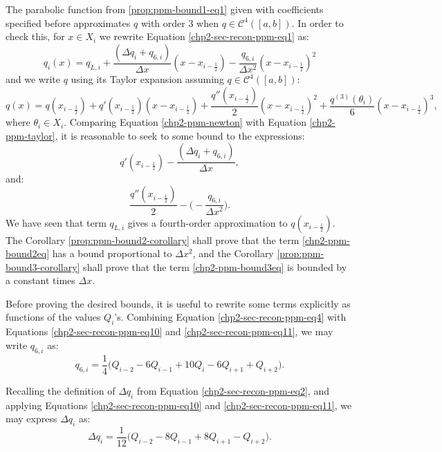 The parabolic function from \eqref{prop:ppm-bound1-eq1} given with 
coefficients specified before approximates $q$ with order 3 when 
$q \in \mathcal{C}^4([a,b])$.
In order to check this, for $x \in X_i$ we rewrite Equation 
\eqref{chp2-sec-recon-ppm-eq1} as: 
\begin{equation}
	\label{chp2-ppm-newton}
	q_i(x) = q_{L,i} + \frac{(\Delta q_i + q_{6, i})}{\Delta x}(x-x_{i-\frac{1}{2}})
	-\frac{q_{6, i}}{\Delta x^2}(x-x_{i-\frac{1}{2}})^2
\end{equation}
and we write $q$ using its Taylor expansion assuming $q \in \mathcal{C}^4([a,b])$:
\begin{equation}
	\label{chp2-ppm-taylor}
	q(x) = q(x_{i-\frac{1}{2}}) + q'(x_{i-\frac{1}{2}})(x-x_{i-\frac{1}{2}})
	+ \frac{q''(x_{i-\frac{1}{2}})}{2}(x-x_{i-\frac{1}{2}})^2
	+ \frac{q^{(3)}(\theta_i)}{6}(x-x_{i-\frac{1}{2}})^3,
\end{equation}
where $\theta_i \in X_i$.
Comparing Equation \eqref{chp2-ppm-newton} with Equation \eqref{chp2-ppm-taylor},
it is reasonable to seek to some bound to the expressions:
\begin{equation}
	\label{chp2-ppm-bound2eq}
	q'(x_{i-\frac{1}{2}})-\frac{(\Delta q_i + q_{6, i})}{\Delta x},
\end{equation}
and:
\begin{equation} 
	\label{chp2-ppm-bound3eq}
	\frac{q''(x_{i-\frac{1}{2}})}{2} -\bigg(-\frac{q_{6, i}}{\Delta x^2}\bigg).
\end{equation}
We have seen that term $q_{L,i}$ gives a fourth-order approximation to $q(x_{i-\frac{1}{2}})$.
The Corollary \ref{prop:ppm-bound2-corollary} shall prove that 
the term \eqref{chp2-ppm-bound2eq} has a bound proportional to $\Delta x^2$, and
the Corollary \ref{prop:ppm-bound3-corollary} shall prove that the
term \eqref{chp2-ppm-bound3eq} is bounded by a constant times $\Delta x$.

Before proving the desired bounds, it is useful to rewrite some terms
explicitly as functions of the values $Q_i$'s.
Combining Equation \eqref{chp2-sec-recon-ppm-eq4} with Equations
\eqref{chp2-sec-recon-ppm-eq10} and \eqref{chp2-sec-recon-ppm-eq11}, 
we may write $q_{6,i}$ as:
\begin{equation}
	\label{def:q6i-2}
	q_{6,i} = \frac{1}{4} \bigg( Q_{i-2} - 6Q_{i-1} + 10Q_{i} -6Q_{i+1}  + Q_{i+2} \bigg).
\end{equation}

Recalling the definition of $\Delta q_i$ from Equation \eqref{chp2-sec-recon-ppm-eq2},
and applying Equations \eqref{chp2-sec-recon-ppm-eq10} and \eqref{chp2-sec-recon-ppm-eq11}, 
we may express $\Delta q_i$ as:
\begin{equation}
	\label{def:dqi-2}
	\Delta q_i = \frac{1}{12} \bigg(Q_{i-2} -8Q_{i-1} + 8Q_{i+1} -Q_{i+2} \bigg).
\end{equation}

